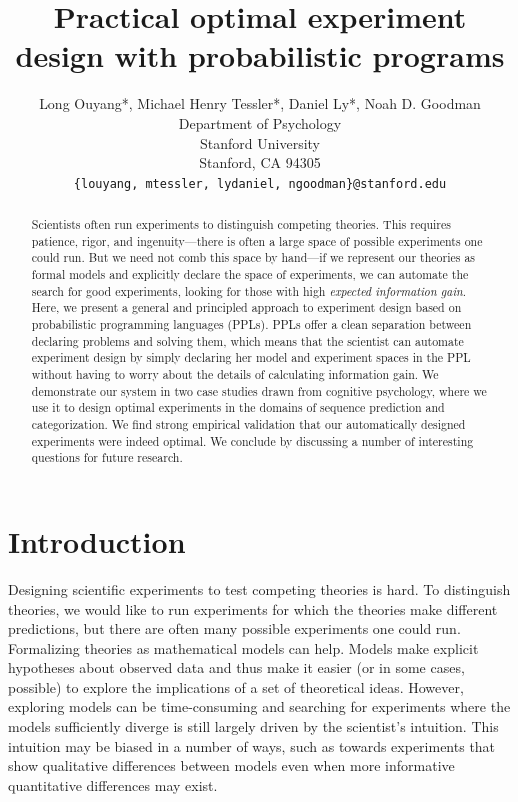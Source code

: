 \documentclass{article}
\title{Practical optimal experiment design with probabilistic programs}
\author{
  Long Ouyang*, Michael Henry Tessler*, Daniel Ly*, Noah D. Goodman\\
  Department of Psychology\\
  Stanford University\\
  Stanford, CA 94305 \\
  \texttt{\{louyang, mtessler, lydaniel, ngoodman\}@stanford.edu}\\
}
\newcommand{\ndg}[1]{\textcolor{Green}{[ndg: #1]}}
\newcommand{\mht}[1]{\textcolor{Blue}{[mht: #1]}}
\newcommand{\lou}[1]{\textcolor{orange}{[lou: #1]}}
\begin{document}

\maketitle

\begin{abstract}

Scientists often run experiments to distinguish competing theories.
This requires patience, rigor, and ingenuity---there is often a large space of possible experiments one could run.
But we need not comb this space by hand---if we represent our theories as formal models and explicitly declare the space of experiments, we can automate the search for good experiments, looking for those with high \emph{expected information gain}.
Here, we present a general and principled approach to experiment design based on probabilistic programming languages (PPLs).
PPLs offer a clean separation between declaring problems and solving them, which means that the scientist can automate experiment design by simply declaring her model and experiment spaces in the PPL without having to worry about the details of calculating information gain.
We demonstrate our system in two case studies drawn from cognitive psychology, where we use it to design optimal experiments in the domains of sequence prediction and categorization.
We find strong empirical validation that our automatically designed experiments were indeed optimal.
We conclude by discussing a number of interesting questions for future research.


\end{abstract}


\section{Introduction}
Designing scientific experiments to test competing theories is hard.
To distinguish theories, we would like to run experiments for which the theories make different predictions, but there are often many possible experiments one could run.
Formalizing theories as mathematical models can help.
Models make explicit hypotheses about observed data and thus make it easier (or in some cases, possible) to explore the implications of a set of theoretical ideas.
However, exploring models can be time-consuming and searching for experiments where the models sufficiently diverge is still largely driven by the scientist's intuition.
This intuition may be biased in a number of ways, such as towards experiments that show qualitative differences between models even when more informative quantitative differences may exist.
\end{document}
